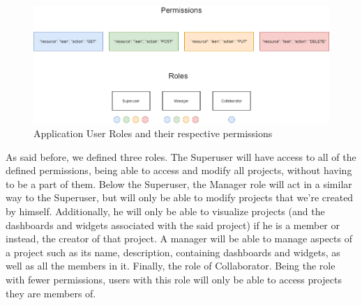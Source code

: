 \documentclass[a4paper,twoside,10pt]{report}
\begin{document}
\begin{figure}[h!]
\center
    \includegraphics[width=\textwidth]{lean-rbac-model.png}
\caption{Application User Roles and their respective permissions}
\end{figure}
As said before, we defined three roles. The Superuser will have access to all of the defined permissions, being able to access and modify all projects,  without having to be a part of them. 
Below the Superuser, the Manager role will act in a similar way to the Superuser, but will only be able to modify projects that we're created by himself. Additionally, he will only be able to visualize projects (and the dashboards and widgets associated with the said project) if he is a member or instead, the creator of that project. A manager will be able to manage aspects of a project such as its name, description, containing dashboards and widgets, as well as all the members in it.
Finally, the role of Collaborator. Being the role with fewer permissions, users with this role will only be able to access projects they are members of.
\end{document}

